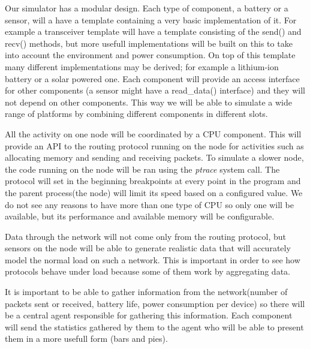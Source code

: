 \label{subsec:architecture}

Our simulator has a modular design. Each type
of component, a battery or a sensor, will a have a template containing a
very basic implementation of it. For example a transceiver template will
have a template consisting of the send() and recv() methods, but more
usefull implementations will be built on this to take into account the
environment and power consumption. On top of this template many different
implementations may be derived; for example a lithium-ion battery or a solar
powered one. Each component will provide an access interface for other components
(a sensor might have a read_data() interface) and they will not depend on other 
components. This way we will be able to simulate a wide range of platforms by
combining different components in different slots.

All the activity on one node will be coordinated by a CPU component. This will provide
an API to the routing protocol running on the node for activities such as allocating memory 
and sending and receiving packets. To simulate a slower node, the code running on the 
node will be ran using the \textit{ptrace} system call. The protocol will set in the beginning
breakpoints at every point in the program and the parent process(the node) will limit
its speed based on a configured value. We do not see any reasons to have more than one
type of CPU so only one will be available, but its performance and available memory
will be configurable.

Data through the network will not come only from the routing protocol, but sensors on the 
node will be able to generate realistic data that will accurately model the normal load
on such a network. This is important in order to see how protocols behave under load 
because some of them work by aggregating data.

It is important to be able to gather information from the network(number of packets sent
or received, battery life, power consumption per device) so there will be a central agent
responsible for gathering this information. Each component will send the statistics gathered
by them to the agent who will be able to present them in a more usefull form (bars and pies).
